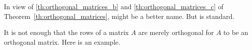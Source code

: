 \documentclass{ximera}
\begin{document}
\begin{remark}\label{rem:orthVsOrthnormMat}
In view of \ref{th:orthogonal_matrices_b} and \ref{th:orthogonal_matrices_c} of Theorem~\ref{th:orthogonal_matrices},  might be a better name. But  is standard.
\end{remark}

It is not enough that the rows of a matrix $A$ are merely orthogonal for $A$ to be an orthogonal matrix. Here is an example.
    
    
    
    
    
    
    
    
    
    
    
    
\end{document}
